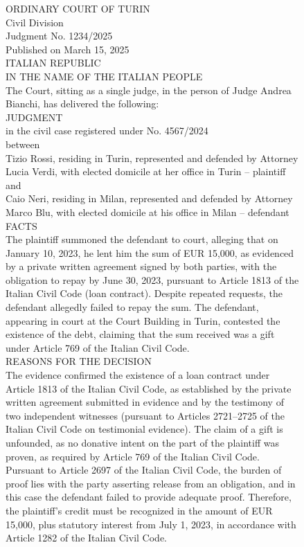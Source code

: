 \begin{figure}[htbp]
\centering
\begin{minipage}{0.9\linewidth}
\ttfamily
\small
ORDINARY COURT OF TURIN\\
Civil Division\\
Judgment No. 1234/2025\\
Published on March 15, 2025\\[1em]
ITALIAN REPUBLIC\\
IN THE NAME OF THE ITALIAN PEOPLE\\[1em]
The Court, sitting as a single judge, in the person of Judge Andrea Bianchi, has delivered the following:\\[1em]
JUDGMENT\\[0.5em]
in the civil case registered under No. 4567/2024\\
between\\[0.5em]
Tizio Rossi, residing in Turin, represented and defended by Attorney Lucia Verdi, with elected domicile at her office in Turin -- plaintiff\\[0.5em]
and\\[0.5em]
Caio Neri, residing in Milan, represented and defended by Attorney Marco Blu, with elected domicile at his office in Milan -- defendant\\[1em]
FACTS\\
The plaintiff summoned the defendant to court, alleging that on January 10, 2023, he lent him the sum of EUR 15,000, as evidenced by a private written agreement signed by both parties, with the obligation to repay by June 30, 2023, pursuant to Article 1813 of the Italian Civil Code (loan contract). Despite repeated requests, the defendant allegedly failed to repay the sum. The defendant, appearing in court at the Court Building in Turin, contested the existence of the debt, claiming that the sum received was a gift under Article 769 of the Italian Civil Code.\\[1em]
REASONS FOR THE DECISION\\
The evidence confirmed the existence of a loan contract under Article 1813 of the Italian Civil Code, as established by the private written agreement submitted in evidence and by the testimony of two independent witnesses (pursuant to Articles 2721--2725 of the Italian Civil Code on testimonial evidence). The claim of a gift is unfounded, as no donative intent on the part of the plaintiff was proven, as required by Article 769 of the Italian Civil Code. Pursuant to Article 2697 of the Italian Civil Code, the burden of proof lies with the party asserting release from an obligation, and in this case the defendant failed to provide adequate proof. Therefore, the plaintiff's credit must be recognized in the amount of EUR 15,000, plus statutory interest from July 1, 2023, in accordance with Article 1282 of the Italian Civil Code.\\[1em]

\end{minipage}
\end{figure}

